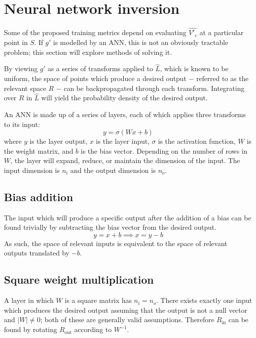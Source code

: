 \documentclass[../../main.tex]{subfiles}
\begin{document}
\section{Neural network inversion} \label{section:neuralNetworkInversion}

Some of the proposed training metrics depend on evaluating $\hat{V'_c}$ at a particular point in $S$.
If $g'$ is modelled by an ANN, this is not an obviously tractable problem; this section will explore methods of solving it.

By viewing $g'$ as a series of transforms applied to $\hat{L}$, which is known to be uniform, the space of points which produce a desired output $-$ referred to as the relevant space $R$ $-$ can be backpropagated through each transform.
Integrating over $R$ in $\hat{L}$ will yield the probability density of the desired output.

An ANN is made up of a series of layers, each of which applies three transforms to its input:
\begin{equation}
    y=\sigma(Wx+b)
\end{equation}
where $y$ is the layer output, $x$ is the layer input, $\sigma$ is the activation function, $W$ is the weight matrix, and $b$ is the bias vector.
Depending on the number of rows in $W$, the layer will expand, reduce, or maintain the dimension of the input.
The input dimension is $n_i$ and the output dimension is $n_o$.

\subsection{Bias addition} \label{subsection:biasAddition}

The input which will produce a specific output after the addition of a bias can be found trivially by subtracting the bias vector from the desired output.
\begin{equation}
    y=x+b\implies x=y-b
\end{equation}
As such, the space of relevant inputs is equivalent to the space of relevant outputs translated by $-b$.

\subsection{Square weight multiplication} \label{subsection:squareWeightMultiplication}

A layer in which $W$ is a square matrix has $n_i=n_o$.
There exists exactly one input which produces the desired output assuming that the output is not a null vector and $|W|\neq 0$; both of these are generally valid assumptions.
Therefore $R_\text{in}$ can be found by rotating $R_\text{out}$ according to $W^{-1}$.
\end{document}
